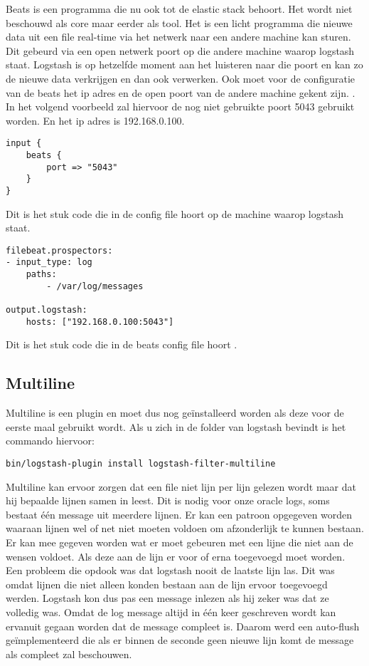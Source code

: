 Beats is een programma die nu ook tot de elastic stack behoort. Het wordt niet beschouwd als core maar eerder als tool. Het is een licht programma die nieuwe data uit een file real-time via het netwerk naar een andere machine kan sturen. Dit gebeurd via een open netwerk poort op die andere machine waarop logstash staat. Logstash is op hetzelfde moment aan het luisteren naar die poort en kan zo de nieuwe data verkrijgen en dan ook verwerken.
Ook moet voor de configuratie van de beats het ip adres en de open poort van de andere machine gekent zijn. . In het volgend voorbeeld zal hiervoor de nog niet gebruikte poort  5043 gebruikt worden. En het ip adres is 192.168.0.100.
\begin{lstlisting}[frame=single]  
input {
	beats {
		port => "5043"
	}
}

\end{lstlisting}
Dit is het stuk code die in de config file hoort op de machine waarop logstash staat.
\begin{lstlisting}[frame=single]  
filebeat.prospectors:
- input_type: log
	paths:
		- /var/log/messages 
		
output.logstash:
	hosts: ["192.168.0.100:5043"]
\end{lstlisting}
Dit is het stuk code die in de beats config file hoort .


\subsection{Multiline}
\label{subsec:multiline}

Multiline is een plugin en moet dus nog geïnstalleerd worden als deze voor de eerste maal gebruikt wordt. Als u zich in de folder van logstash bevindt is het commando hiervoor:

\begin{lstlisting}[frame=single]  
bin/logstash-plugin install logstash-filter-multiline
\end{lstlisting}

Multiline kan ervoor zorgen dat een file niet lijn per lijn gelezen wordt maar dat hij bepaalde lijnen samen in leest. Dit is nodig voor onze oracle logs, soms bestaat één message uit meerdere lijnen.
Er kan een patroon opgegeven worden waaraan lijnen wel of net niet moeten voldoen om afzonderlijk te kunnen bestaan. Er kan mee gegeven worden wat er moet gebeuren met een lijne die niet aan de wensen voldoet. Als deze aan de lijn er voor of erna toegevoegd moet worden. 
Een probleem die opdook was dat logstash nooit de laatste lijn las. Dit was omdat lijnen die niet alleen konden bestaan aan de lijn ervoor toegevoegd werden. Logstash kon dus pas een message inlezen als hij zeker was dat ze volledig was. Omdat de log message altijd in één keer geschreven wordt kan ervanuit gegaan worden dat de message compleet is. Daarom werd een auto-flush geïmplementeerd die als er binnen de seconde geen nieuwe lijn komt de message als compleet zal beschouwen.

